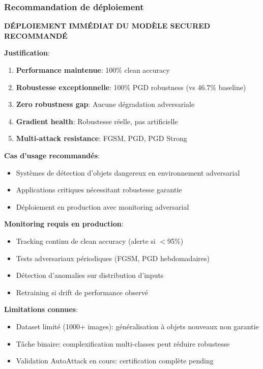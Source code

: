 \subsubsection{Recommandation de déploiement}

\textbf{DÉPLOIEMENT IMMÉDIAT DU MODÈLE SECURED RECOMMANDÉ} \checkmark

\textbf{Justification}:

\begin{enumerate}
    \item[\checkmark] \textbf{Performance maintenue}: 100\% clean accuracy
    \item[\checkmark] \textbf{Robustesse exceptionnelle}: 100\% PGD robustness (vs 46.7\% baseline)
    \item[\checkmark] \textbf{Zero robustness gap}: Aucune dégradation adversariale
    \item[\checkmark] \textbf{Gradient health}: Robustesse réelle, pas artificielle
    \item[\checkmark] \textbf{Multi-attack resistance}: FGSM, PGD, PGD Strong
\end{enumerate}

\textbf{Cas d'usage recommandés}:

\begin{itemize}
    \item Systèmes de détection d'objets dangereux en environnement adversarial
    \item Applications critiques nécessitant robustesse garantie
    \item Déploiement en production avec monitoring adversarial
\end{itemize}

\textbf{Monitoring requis en production}:

\begin{itemize}
    \item Tracking continu de clean accuracy (alerte si $<$95\%)
    \item Tests adversariaux périodiques (FGSM, PGD hebdomadaires)
    \item Détection d'anomalies sur distribution d'inputs
    \item Retraining si drift de performance observé
\end{itemize}

\textbf{Limitations connues}:

\begin{itemize}
    \item Dataset limité (1000+ images): généralisation à objets nouveaux non garantie
    \item Tâche binaire: complexification multi-classes peut réduire robustesse
    \item Validation AutoAttack en cours: certification complète pending
\end{itemize}

